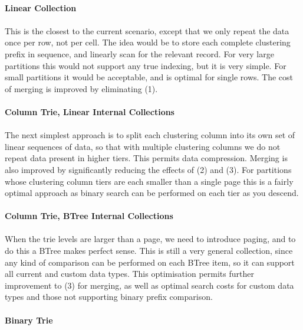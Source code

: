 \documentclass[fleqn]{article}
\begin{document}
\paragraph{Linear Collection}
\paragraph{}
    This is the closest to the current scenario, except that we only repeat the data once per row,
    not per cell. The idea would be to store each complete clustering prefix in sequence,
    and linearly scan for the relevant record. For very large partitions this would not support 
    any true indexing, but it is very simple. For small partitions it would be acceptable, and is
    optimal for single rows. The cost of merging is improved by eliminating (1).
\paragraph{Column Trie, Linear Internal Collections}
\paragraph{}
    The next simplest approach is to split each clustering column into its own set of linear
    sequences of data, so that with multiple clustering columns we do not repeat data present
    in higher tiers. This permits data compression. Merging is also improved by significantly
    reducing the effects of (2) and (3). For partitions whose clustering column tiers are 
    each smaller than a single page this is a fairly optimal approach as binary search 
    can be performed on each tier as you descend.
\paragraph{Column Trie, BTree Internal Collections}
\paragraph{}
    When the trie levels are larger than a page, we need to introduce paging, and to do this a
    BTree makes perfect sense. This is still a very general collection, since any kind of comparison
    can be performed on each BTree item, so it can support all current and custom data types.
    This optimisation permits further improvement to (3) for merging, as well as optimal
    search costs for custom data types and those not supporting binary prefix comparison.
\paragraph{Binary Trie}
\end{document}
